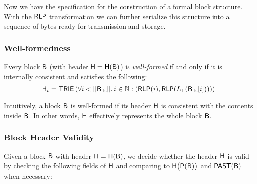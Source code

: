 Now we have the specification for the construction of a formal block structure. 
With the $\mathsf{RLP}$ transformation we can further serialize this structure into a sequence of bytes ready for transmission and storage. 
 

  
\subsubsection{Well-formedness}
\label{sec:internal consistency}
Every {\name} block $\textsf{B}$ (with header $\textsf{H}=\textsf{H}(\textsf{B})$) is \emph{well-formed} if and only if it is internally consistent and satisfies the following: 
\begin{align}
	\head_t = \trie\left(\forall i<||\block_{\txs}||, i\in \N: \left(\rlp(i),\rlp(L_{\tx}(\block_{\txs}[i]))\right) \right)  
\end{align}

Intuitively, a block $\textsf{B}$ is well-formed if its header $\textsf{H}$ is consistent with the contents inside $\textsf{B}$.
In other words, $\textsf{H}$ effectively represents the whole block $\textsf{B}$.




\subsubsection{Block Header Validity}
\label{sec:valid header}

Given a block $\textsf{B}$ with header $\textsf{H}=\textsf{H}(\textsf{B})$, 
we decide whether the header $\textsf{H}$ is valid by 
checking the following fields of $\textsf{H}$
and comparing to $\textsf{H}\big(\mathsf{P}(\textsf{B})\big)$ and $\mathsf{PAST}(\textsf{B})$ when necessary:


